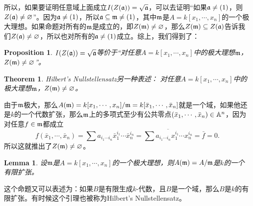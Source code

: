 \documentclass[9pt]{extarticle}
\theoremstyle{plain}%
\newtheorem{pro}[defi]{Proposition}%
\newtheorem{theo}[defi]{Theorem}%
\newtheorem{lem}[defi]{Lemma}%
\begin{document}
所以，如果要证明任意域上面成立$I(Z(\mathfrak{a}))=\sqrt{\mathfrak{a}}$，可以去证明“如果$\mathfrak{a}\neq(1)$，则$Z(\mathfrak{a})\neq\varnothing$”。因为$\mathfrak{a}\neq(1)$，所以$\mathfrak{a}\subseteq \mathfrak{m} \neq(1)$，其中$\mathfrak{m}$是$A=k[x_1,\cdots,x_n]$的一个极大理想。如果命题对所有的$\mathfrak{m}$是成立的，即$Z(\mathfrak{m})\neq \varnothing$，那么$Z(\mathfrak{m})\subseteq Z(\mathfrak{a})$告诉我们$Z(\mathfrak{a})\neq \varnothing$，所以也对所有的$\mathfrak{a}\neq (1)$成立。综上，我们得到了：
\begin{pro}
$I(Z(\mathfrak{a}))=\sqrt{\mathfrak{a}}$等价于“对任意$A=k[x_1,\cdots,x_n]$中的极大理想$\mathfrak{m}$，$Z(\mathfrak{m})\neq\varnothing$”。
\end{pro}
\begin{theo}Hilbert's Nullstellensatz另一种表述：
对任意$A=k[x_1,\cdots,x_n]$中的极大理想$\mathfrak{m}$，$Z(\mathfrak{m})\neq\varnothing$。
\end{theo}
	由于$\mathfrak{m}$极大，那么$A(\mathfrak{m})=k[x_1,\cdots,x_n]/\mathfrak{m}=k[\bar{x}_1,\cdots,\bar{x}_n]$就是一个域，如果他还是$k$的一个代数扩张，那么$\mathfrak{m}$上的多项式至少有公共零点$(\bar{x}_1,\cdots,\bar{x}_n)\in \mathbb{A}^n$，因为对任意$f\in \mathfrak{m}$都成立
	\[
		f(\bar{x}_1,\cdots,\bar{x}_n)=\sum a_{i_1\cdots i_n} {\bar{x}}_1^{i_1}\cdots {\bar{x}}_n^{i_n}=\overline{\sum a_{i_1\cdots i_n} x_1^{i_1}\cdots x_n^{i_n}}=\bar{f}=0.
	\]
	所以这就推出了$Z(\mathfrak{m})\neq\varnothing$。
\begin{lem}
	设$\mathfrak{m}$是$A=k[x_1,\cdots,x_n]$的一个极大理想，则$A(\mathfrak{m})=A/\mathfrak{m}$是$k$的一个有限扩张。
	\label{l1.3}
\end{lem}
这个命题又可以表述为：如果$B$是有限生成$k$-代数，且$B$是一个域，那么$B$是$k$的有限扩张。有时候这个引理也被称为Hilbert's Nullstellensatz。
\end{document}
